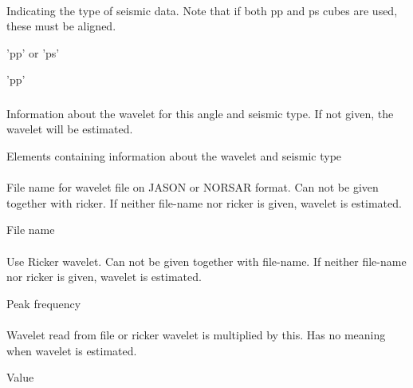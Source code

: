 \paragraph{}
 \slist
   \item \Description Indicating the type of seismic data. Note that if both pp and ps cubes are used, these must be aligned.
   \item \Argument 'pp' or 'ps'
   \item \Default 'pp'
 \elist

\subsubsection{}
 \slist
   \item \Description Information about the wavelet for this angle and seismic type. If not given, the wavelet will be estimated.
   \item \Argument Elements containing information about the wavelet and seismic type
   \item \Default
 \elist

\paragraph{}
 \slist
   \item \Description File name for wavelet file on JASON or NORSAR format. Can not be given together with ricker. If neither file-name nor ricker is given, wavelet is estimated.
   \item \Argument File name
   \item \Default
 \elist

\paragraph{}
 \slist
   \item \Description Use Ricker wavelet. Can not be given together with file-name. If neither file-name nor ricker is given, wavelet is estimated.
   \item \Argument Peak frequency
   \item \Default
 \elist

\paragraph{}
 \slist
   \item \Description Wavelet read from file or ricker wavelet is multiplied by this. Has no meaning when wavelet is estimated.
   \item \Argument Value
   \item \Default
 \elist

